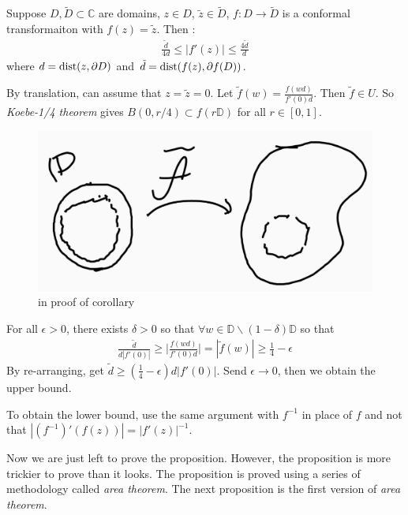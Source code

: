 \documentclass[12pt,a4paper]{article}
\newenvironment{proof}
{\begin{changemargin}{0.5cm}{0.5cm} 
	}%
	{\end{changemargin}
}
\begin{document}
\corr Suppose $D, \tilde{D} \subset \mathbb{C}$ are domains, $z\in D$, $\tilde{z} \in \tilde{D}$, $f: D\rightarrow \tilde{D}$ is a conformal transformaiton with $f(z) = \tilde{z}$. Then :
\begin{align*}
\frac{\tilde{d}}{4d} \leq |f'(z)| \leq \frac{4\tilde{d}}{d}
\end{align*}
where $d= \text{dist}(z, \partial D)$ and $\tilde{d} = \text{dist}(f(z), \partial f(D))$.
\begin{proof}
\pf By translation, can assume that $z=\tilde{z} =0$. Let $\tilde{f}(w) = \frac{f(wd)}{f'(0)d}$. Then $\tilde{f}\in U$. So \emph{Koebe-1/4 theorem} gives $B(0, r/4) \subset f(r\mathbb{D})$ for all $r\in [0,1]$.

\begin{figure}[h]
\begin{center}
    \includegraphics[scale =0.15]{4}
    \caption{in proof of corollary}
\end{center}
\end{figure}

For all $\epsilon>0$, there exists $\delta >0$ so that $\forall w\in \mathbb{D} \backslash (1-\delta) \mathbb{D}$ so that
\begin{align*}
\frac{\tilde{d}}{d|f'(0)|} \geq \Big| \frac{f(wd)}{f'(0)d}\Big| = |\tilde{f}(w)| \geq \frac{1}{4} - \epsilon
\end{align*}
By re-arranging, get $\tilde{d} \geq (\frac{1}{4} - \epsilon)d|f'(0)|$. Send $\epsilon \rightarrow 0$, then we obtain the upper bound.
\s

\quad To obtain the lower bound, use the same argument with $f^{-1}$ in place of $f$ and not that $|(f^{-1})'(f(z))| = |f'(z)|^{-1}$.

\eop
\end{proof}
\s

Now we are just left to prove the proposition. However, the proposition is more trickier to prove than it looks. The proposition is proved using a series of methodology called \emph{area theorem}. The next proposition is the first version of \emph{area theorem}.
\s
\end{document}
